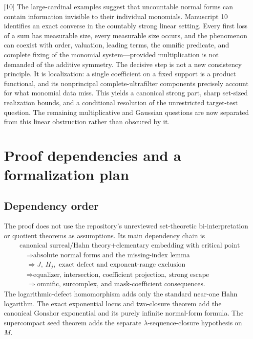 \documentclass[11pt,letterpaper]{article}
\numberwithin{equation}{section}
\theoremstyle{definition}
\theoremstyle{remark}
\newcommand{\src}[1]{\textup{\textsf{\small[#1]}}}%
\begin{document}
\src{10} The large-cardinal examples suggest that uncountable normal forms
can contain information invisible to their individual monomials.
Manuscript 10 identifies an exact converse in the countably strong linear
setting. Every first loss of a sum has measurable size, every measurable
size occurs, and the phenomenon can coexist with order, valuation, leading
terms, the omnific predicate, and complete fixing of the monomial
system---provided multiplication is not demanded of the additive symmetry.
The decisive step is not a new consistency principle. It is localization: a
single coefficient on a fixed support is a product functional, and its
nonprincipal complete-ultrafilter components precisely account for what
monomial data miss. This yields a canonical strong part, sharp set-sized
realization bounds, and a conditional resolution of the unrestricted
target-test question. The remaining multiplicative and Gaussian questions
are now separated from this linear obstruction rather than obscured by it.

\appendix
\section{Proof dependencies and a formalization plan}\label{lce:app:formalization}

\subsection{Dependency order}
The proof does not use the repository's unreviewed set-theoretic
bi-interpretation or quotient theorems as assumptions. Its main dependency
chain is
\begin{align*}
 &\text{canonical surreal/Hahn theory}
   +\text{elementary embedding with critical point}\\
 &\hspace{12pt}\Longrightarrow
   \text{absolute normal forms and the missing-index lemma}\\
 &\hspace{12pt}\Longrightarrow J,\ H_j,
   \text{ exact defect and exponent-range exclusion}\\
 &\hspace{12pt}\Longrightarrow
   \text{equalizer, intersection, coefficient projection, strong escape}\\
 &\hspace{12pt}\Longrightarrow
   \text{omnific, surcomplex, and mask-coefficient consequences}.
\end{align*}
The logarithmic-defect homomorphism adds only the standard near-one Hahn
logarithm. The exact exponential locus and two-closure theorem add the
canonical Gonshor exponential and its purely infinite normal-form
formula. The supercompact seed theorem adds the separate
$\lambda$-sequence-closure hypothesis on $M$.
\end{document}
